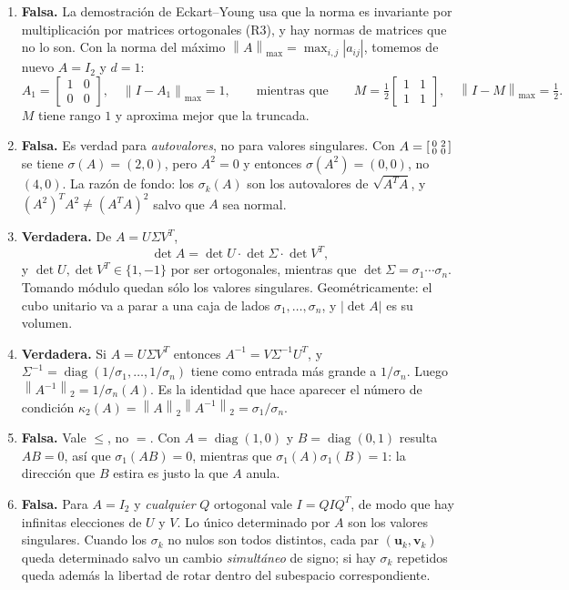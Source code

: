 \documentclass[11pt,a4paper]{article}
\newenvironment{solucion}{\solucionfmt}{\endsolucionfmt}
\newcommand{\bi}[1]{\boldsymbol{#1}}
\DeclareMathOperator{\diag}{diag}
\newcommand{\norm}[1]{\left\|#1\right\|}
\newcommand{\normdos}[1]{\left\|#1\right\|_{2}}
\begin{document}
\begin{solucion}
\begin{enumerate}[label=\textbf{\arabic*.},itemsep=4pt,topsep=4pt,leftmargin=*]
\item \textbf{Falsa.} La demostración de Eckart--Young usa que la norma es
invariante por multiplicación por matrices ortogonales (R3), y hay normas de
matrices que no lo son. Con la norma del máximo
$\norm{A}_{\max}=\max_{i,j}|a_{ij}|$, tomemos de nuevo $A=I_2$ y $d=1$:
\[
A_1=\begin{bmatrix}1&0\\0&0\end{bmatrix},\quad \norm{I-A_1}_{\max}=1,
\qquad\text{mientras que}\qquad
M=\tfrac12\begin{bmatrix}1&1\\1&1\end{bmatrix},\quad \norm{I-M}_{\max}=\tfrac12 .
\]
$M$ tiene rango $1$ y aproxima mejor que la truncada.

\item \textbf{Falsa.} Es verdad para \emph{autovalores}, no para valores
singulares. Con
$A=\begin{bsmallmatrix}0&2\\0&0\end{bsmallmatrix}$ se tiene
$\sigma(A)=(2,0)$, pero $A^2=0$ y entonces $\sigma(A^2)=(0,0)$, no $(4,0)$.
La razón de fondo: los $\sigma_k(A)$ son los autovalores de $\sqrt{A^TA}$, y
$(A^2)^TA^2\neq(A^TA)^2$ salvo que $A$ sea normal.

\item \textbf{Verdadera.} De $A=U\Sigma V^T$,
\[
\det A=\det U\cdot\det\Sigma\cdot\det V^T ,
\]
y $\det U,\det V^T\in\{1,-1\}$ por ser ortogonales, mientras que
$\det\Sigma=\sigma_1\cdots\sigma_n$. Tomando módulo quedan sólo los valores
singulares. Geométricamente: el cubo unitario va a parar a una caja de lados
$\sigma_1,\dots,\sigma_n$, y $|\det A|$ es su volumen.

\item \textbf{Verdadera.} Si $A=U\Sigma V^T$ entonces
$A^{-1}=V\Sigma^{-1}U^T$, y
$\Sigma^{-1}=\diag(1/\sigma_1,\dots,1/\sigma_n)$ tiene como entrada más
grande a $1/\sigma_n$. Luego $\normdos{A^{-1}}=1/\sigma_n(A)$. Es la
identidad que hace aparecer el número de condición
$\kappa_2(A)=\normdos{A}\normdos{A^{-1}}=\sigma_1/\sigma_n$.

\item \textbf{Falsa.} Vale $\le$, no $=$. Con $A=\diag(1,0)$ y
$B=\diag(0,1)$ resulta $AB=0$, así que $\sigma_1(AB)=0$, mientras que
$\sigma_1(A)\sigma_1(B)=1$: la dirección que $B$ estira es justo la que $A$
anula.

\item \textbf{Falsa.} Para $A=I_2$ y \emph{cualquier} $Q$ ortogonal vale
$I=QIQ^T$, de modo que hay infinitas elecciones de $U$ y $V$. Lo único
determinado por $A$ son los valores singulares. Cuando los $\sigma_k$ no
nulos son todos distintos, cada par $(\bi u_k,\bi v_k)$ queda determinado
salvo un cambio \emph{simultáneo} de signo; si hay $\sigma_k$ repetidos queda
además la libertad de rotar dentro del subespacio correspondiente.


\end{enumerate}
\end{solucion}
\end{document}
